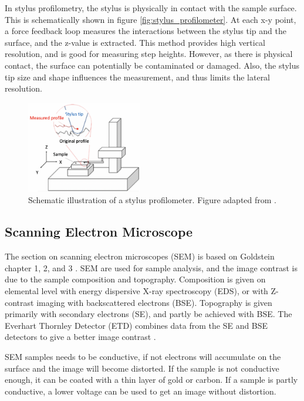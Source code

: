 In stylus profilometry, the stylus is physically in contact with the sample surface.
This is schematically shown in figure \autoref{fig:stylus_profilometer}.
At each x-y point, a force feedback loop measures the interactions between the stylus tip and the surface, and the z-value is extracted.
This method provides high vertical resolution, and is good for measuring step heights.
However, as there is physical contact, the surface can potentially be contaminated or damaged.
Also, the stylus tip size and shape influences the measurement, and thus limits the lateral resolution.

\begin{figure}[ht]
    \centering
    \includegraphics[width=0.45\textwidth]{figures/profilometer.png}
    \caption{Schematic illustration of a stylus profilometer. Figure adapted from \cite{profilometer_manual}.}
    \label{fig:stylus_profilometer}
\end{figure}


\subsection{Scanning Electron Microscope}

\noindent The section on scanning electron microscopes (SEM) is based on Goldstein chapter 1, 2, and 3 \cite{goldstein_scanning_2018}.
SEM are used for sample analysis, and the image contrast is due to the sample composition and topography.
Composition is given on elemental level with energy dispersive X-ray spectroscopy (EDS), or with Z-contrast imaging with backscattered electrons (BSE).
Topography is given primarily with secondary electrons (SE), and partly be achieved with BSE.
The Everhart Thornley Detector (ETD) combines data from the SE and BSE detectors to give a better image contrast \cite{T_Everhart_1960}.


SEM samples needs to be conductive, if not electrons will accumulate on the surface and the image will become distorted.
If the sample is not conductive enough, it can be coated with a thin layer of gold or carbon.
If a sample is partly conductive, a lower voltage can be used to get an image without distortion.

